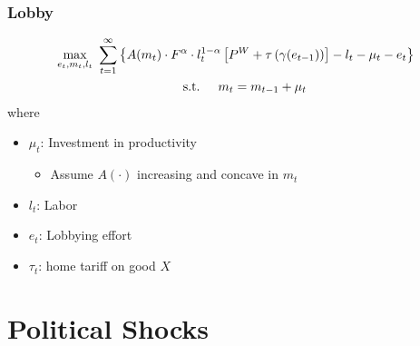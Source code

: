 \documentclass{beamer}
\newcommand{\ga}{\gamma}
\begin{document}
\begin{frame}
\frametitle{Lobby}
\pause
\begin{multline*}
  \max_{e_t,m_t,l_t} \ \sum_{t=1}^\infty \left\{ A(m_t) \cdot F^\alpha \cdot l_t^{1-\alpha}\left[P^W + \tau\left(\gamma(e_{t-1})\right)\right] - l_t - \mu_t - e_t \right\} \\ \hskip.2in \text{s.t.} \hskip.2in m_t = m_{t-1} + \mu_{t} %
\end{multline*}
\pause
where 

\pause
\begin{itemize}[<+->]
	\item $\mu_t$: Investment in productivity
		\begin{itemize}
			\item Assume $A(\cdot)$ increasing and concave in $m_t$
		\end{itemize}
	\item $l_t$: Labor
	\item $e_t$: Lobbying effort
	\item $\tau_t$: home tariff on good $X$
\end{itemize}


\end{frame}


\section{Political Shocks}
\subsection{}
\end{document}

